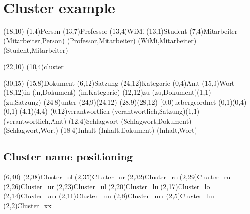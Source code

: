 \documentclass[a4paper,11pt]{article}
\begin{document}
\section{Cluster example}

\begin{schema}(18,10)
  \entity(1,4){Person}
  \relation(13,7){Professor}
  \relation(13,4){WiMi}
  \relation(13,1){Student}
  \cluster(7,4){Mitarbeiter}
  \connection(Mitarbeiter,Person){}
  \connection(Professor,Mitarbeiter){}
  \connection(WiMi,Mitarbeiter){}
  \connection(Student,Mitarbeiter){}
\end{schema}

\begin{schema}(22,10)
  \cluster(10,4){cluster}
\end{schema}

\setlength{\hermunit}{.5cm}
\begin{schema}(30,15)
\entity(15,8){Dokument}
%
\entity(6,12){Satzung}
%
\entity(24,12){Kategorie}
%
\entity(0,4){Amt}
%
\entity(15,0){Wort}
%
\relation(18,12){in}
\connection(in,Dokument){}
\connection(in,Kategorie){}
%
\relation(12,12){zu}
\connection(zu,Dokument){(1,1)}
\connection(zu,Satzung){}
%
\relation(24,8){unter}
\connection*(24,9)(24,12){}
\connection*(28,9)(28,12){}
%
\relation(0,0){uebergeordnet}
\connection*(0,1)(0,4){(0,1)}
\connection*(4,1)(4,4){}
%
\relation(0,12){verantwortlich}
\connection(verantwortlich,Satzung){(1,1)}
\connection(verantwortlich,Amt){}
%
\relation(12,4){Schlagwort}
\connection(Schlagwort,Dokument){}
\connection(Schlagwort,Wort){}
%
\relation(18,4){Inhalt}
\connection(Inhalt,Dokument){}
\connection(Inhalt,Wort){}
\end{schema}

\subsection{Cluster name positioning}

\begin{schema}(6,40)
\cluster*(2,38){Cluster\_ol}
\cluster*(2,35){Cluster\_or}
\cluster*(2,32){Cluster\_ro}
\cluster*(2,29){Cluster\_ru}
\cluster*(2,26){Cluster\_ur}
\cluster*(2,23){Cluster\_ul}
\cluster*(2,20){Cluster\_lu}
\cluster*(2,17){Cluster\_lo}
\cluster*(2,14){Cluster\_om}
\cluster*(2,11){Cluster\_rm}
\cluster*(2,8){Cluster\_um}
\cluster*(2,5){Cluster\_lm}
\cluster*(2,2){Cluster\_xx}
\end{schema}
\end{document}
